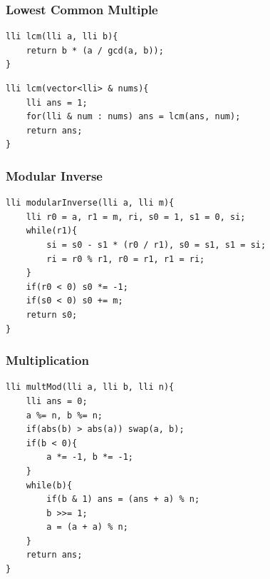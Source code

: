 \documentclass[twoside]{article}
\begin{document}
\begin{multicols*}{2}
\begin{verbatim}
\end{verbatim}

\subsubsectionfont{\large\bfseries\sffamily\underline}
\subsubsection*{Lowest Common Multiple}
\begin{verbatim}
lli lcm(lli a, lli b){
	return b * (a / gcd(a, b));
}

\end{verbatim}
\vspace{-12pt}
\begin{verbatim}
lli lcm(vector<lli> & nums){
	lli ans = 1;
	for(lli & num : nums) ans = lcm(ans, num);
	return ans;
}

\end{verbatim}

\subsubsectionfont{\large\bfseries\sffamily\underline}
\subsubsection*{Modular Inverse}
\begin{verbatim}
lli modularInverse(lli a, lli m){
	lli r0 = a, r1 = m, ri, s0 = 1, s1 = 0, si;
	while(r1){
		si = s0 - s1 * (r0 / r1), s0 = s1, s1 = si;
		ri = r0 % r1, r0 = r1, r1 = ri;
	}
	if(r0 < 0) s0 *= -1;
	if(s0 < 0) s0 += m;
	return s0;
}

\end{verbatim}

\subsubsectionfont{\large\bfseries\sffamily\underline}
\subsubsection*{Multiplication}
\begin{verbatim}
lli multMod(lli a, lli b, lli n){
	lli ans = 0;
	a %= n, b %= n;
	if(abs(b) > abs(a)) swap(a, b);
	if(b < 0){
		a *= -1, b *= -1;
	}
	while(b){
		if(b & 1) ans = (ans + a) % n;
		b >>= 1;
		a = (a + a) % n;
	}
	return ans;
}

\end{verbatim}

\subsubsectionfont{\large\bfseries\sffamily\underline}

\end{multicols*}
\end{document}
